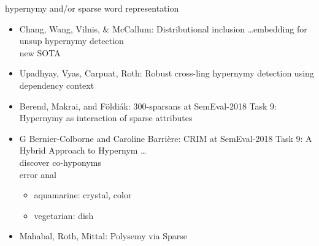 \documentclass{beamer}
\begin{document}
\begin{frame}{hypernymy and/or sparse word representation}
  \begin{itemize}
    \item Chang, Wang, Vilnis, \& McCallum: Distributional inclusion \dots  embedding for
      unsup hypernymy detection
      \\ new SOTA
    \item Upadhyay, Vyas, Carpuat, Roth: Robust cross-ling hypernymy detection using dependency context
    \item Berend, Makrai, and Földiák: 300-sparsans at SemEval-2018 Task 9: \\ Hypernymy as interaction of sparse attributes
    \item G Bernier-Colborne and Caroline Barrière: CRIM at SemEval-2018 Task 9: A
      Hybrid Approach to Hypernym \dots 
      \\ discover co-hyponyms
      \\ error anal
      \begin{itemize}
        \item aquamarine: crystal, color
        \item vegetarian: dish
      \end{itemize}
    \item Mahabal, Roth, Mittal: Polysemy via Sparse
  \end{itemize}
\end{frame}
\end{document}

